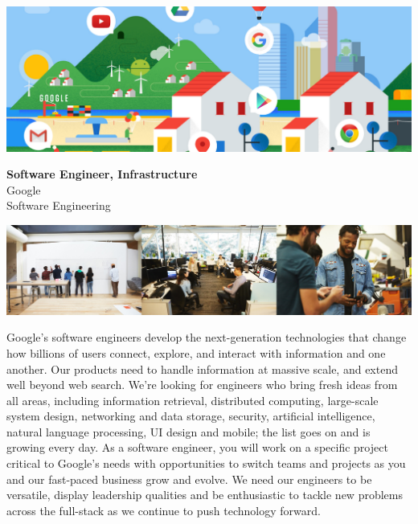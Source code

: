 \newpage
\ifodd\value{page}\hbox{}\newpage\fi





\begin{sloppypar}
\begin{ssmall}
\includegraphics[width=\linewidth]{ads/Google_Cover_Photo.png}

\vspace{2mm}
{\footnotesize{\textbf{Software Engineer, Infrastructure}}} \\
Google \\
Software Engineering

\vspace{3mm}
\includegraphics[width=\linewidth]{ads/Google_Pictures.png}

Google's software engineers develop the next-generation technologies that change how billions of users connect, explore, and interact with information and one another. Our products need to handle information at massive scale, and extend well beyond web search. We're looking for engineers who bring fresh ideas from all areas, including information retrieval, distributed computing, large-scale system design, networking and data storage, security, artificial intelligence, natural language processing, UI design and mobile; the list goes on and is growing every day. As a software engineer, you will work on a specific project critical to Google’s needs with opportunities to switch teams and projects as you and our fast-paced business grow and evolve. We need our engineers to be versatile, display leadership qualities and be enthusiastic to tackle new problems across the full-stack as we continue to push technology forward.


\end{ssmall}
\end{sloppypar}
